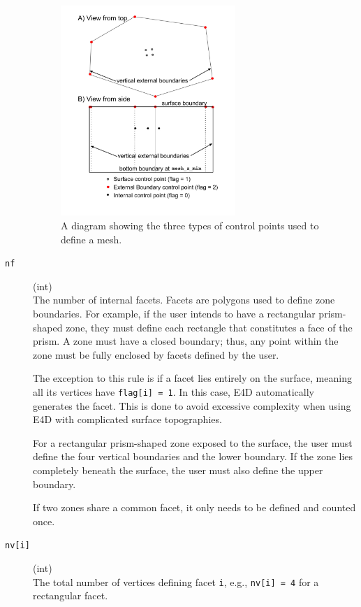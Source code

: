 \documentclass[a4paper,12pt]{article}
\begin{document}
\begin{description}
    \begin{figure}[H]
    \centering
    \includegraphics[width=2.6in]{figures/control_point_flags.png} %
    \caption{A diagram showing the three types of control points used to define a mesh.}
    \label{fig:screenshot}
    \end{figure}

    \item[\texttt{nf}] (int)\hfill \\
    The number of internal facets. Facets are polygons used to define zone boundaries. For example, if the user intends to have a rectangular prism-shaped zone, they must define each rectangle that constitutes a face of the prism. A zone must have a closed boundary; thus, any point within the zone must be fully enclosed by facets defined by the user.

    The exception to this rule is if a facet lies entirely on the surface, meaning all its vertices have \texttt{flag[i] = 1}. In this case, E4D automatically generates the facet. This is done to avoid excessive complexity when using E4D with complicated surface topographies.

    For a rectangular prism-shaped zone exposed to the surface, the user must define the four vertical boundaries and the lower boundary. If the zone lies completely beneath the surface, the user must also define the upper boundary.
    
    If two zones share a common facet, it only needs to be defined and counted once.

    \item[\texttt{nv[i]}] (int)\hfill \\
    The total number of vertices defining facet \texttt{i}, e.g., \texttt{nv[i] = 4} for a rectangular facet.


\end{description}
\end{document}
